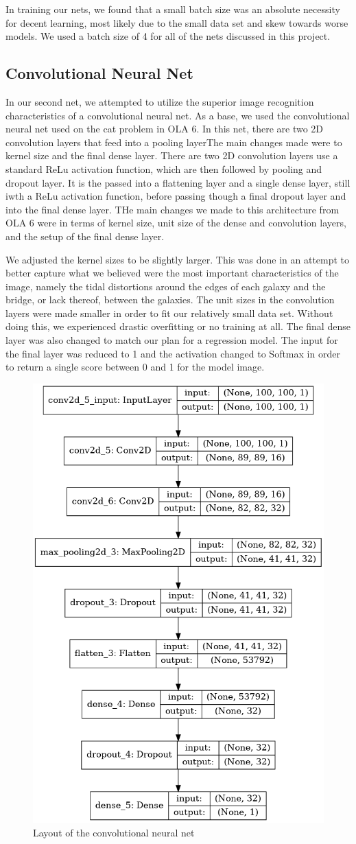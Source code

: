 \documentclass[conference]{IEEEtran}
\begin{document}
In training our nets, we found that a small batch size was an absolute necessity for decent learning, most likely due to the small data set and skew towards worse models. We used a batch size of 4 for all of the nets discussed in this project.

\subsection{Convolutional Neural Net}

In our second net, we attempted to utilize the superior image recognition characteristics of a convolutional neural net. As a base, we used the convolutional neural net used on the cat problem in OLA 6. In this net, there are two 2D convolution layers that feed into a pooling layerThe main changes made were to kernel size and the final dense layer. There are two 2D convolution layers use a standard ReLu activation function, which are then followed by pooling and dropout layer. It is the passed into a flattening layer and a single dense layer, still iwth a ReLu activation function, before passing though a final dropout layer and into the final dense layer. THe main changes we made to this architecture from OLA 6 were in terms of kernel size, unit size of the dense and convolution layers, and the setup of the final dense layer. 

We adjusted the kernel sizes to be slightly larger. This was done in an attempt to better capture what we believed were the most important characteristics of the image, namely the tidal distortions around the edges of each galaxy and the bridge, or lack thereof, between the galaxies. The unit sizes in the convolution layers were made smaller in order to fit our relatively small data set. Without doing this, we experienced drastic overfitting or no training at all. The final dense layer was also changed to match our plan for a regression model. The input for the final layer was reduced to 1 and the activation changed to Softmax in order to return a single score between 0 and 1 for the model image.

\begin{figure}[htbp]
\centerline{\includegraphics[width=0.5\linewidth]{./Images/convNet.png}}
\caption{Layout of the convolutional neural net}
\label{fig:ConvNetArchitecture}
\end{figure}
\end{document}
